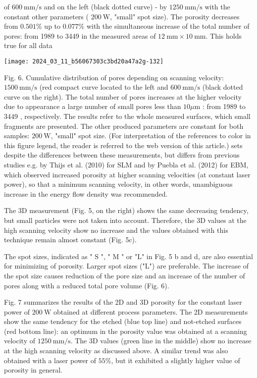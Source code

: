 \documentclass[10pt]{article}
\begin{document}
of $600 \mathrm{~mm} / \mathrm{s}$ and on the left (black dotted curve) - by $1250 \mathrm{~mm} / \mathrm{s}$ with the constant other parameters ( $200 \mathrm{~W}$, "small" spot size). The porosity decreases from $0.501 \%$ up to $0.077 \%$ with the simultaneous increase of the total number of pores: from 1989 to 3449 in the measured areas of $12 \mathrm{~mm} \times 10 \mathrm{~mm}$. This holds true for all data

\begin{center}
\texttt{[image: 2024\_03\_11\_b56067303c3bd20a47a2g-132]}
\end{center}

Fig. 6. Cumulative distribution of pores depending on scanning velocity: $1500 \mathrm{~mm} / \mathrm{s}$ (red compact curve located to the left and $600 \mathrm{~mm} / \mathrm{s}$ (black dotted curve on the right). The total number of pores increases at the higher velocity due to appearance a large number of small pores less than $10 \mu \mathrm{m}$ : from 1989 to 3449 , respectively. The results refer to the whole measured surfaces, which small fragments are presented. The other produced parameters are constant for both samples: $200 \mathrm{~W}$, "small" spot size. (For interpretation of the references to color in this figure legend, the reader is referred to the web version of this article.) sets despite the differences between these measurements, but differs from previous studies e.g. by Thijs et al. (2010) for SLM and by Puebla et al. (2012) for EBM, which observed increased porosity at higher scanning velocities (at constant laser power), so that a minimum scanning velocity, in other words, unambiguous increase in the energy flow density was recommended.

The 3D measurement (Fig. 5, on the right) shows the same decreasing tendency, but small particles were not taken into account. Therefore, the 3D values at the high scanning velocity show no increase and the values obtained with this technique remain almost constant (Fig. 5c).

The spot sizes, indicated as " $\mathrm{S}$ ", " $\mathrm{M}$ " or "L" in Fig. 5 b and d, are also essential for minimizing of porosity. Larger spot sizes ("L") are preferable. The increase of the spot size causes reduction of the pore size and an increase of the number of pores along with a reduced total pore volume (Fig. 6).

Fig. 7 summarizes the results of the 2D and 3D porosity for the constant laser power of $200 \mathrm{~W}$ obtained at different process parameters. The 2D measurements show the same tendency for the etched (blue top line) and not-etched surfaces (red bottom line): an optimum in the porosity value was obtained at a scanning velocity of $1250 \mathrm{~mm} / \mathrm{s}$. The 3D values (green line in the middle) show no increase at the high scanning velocity as discussed above. A similar trend was also obtained with a laser power of $55 \%$, but it exhibited a slightly higher value of porosity in general.
\end{document}
